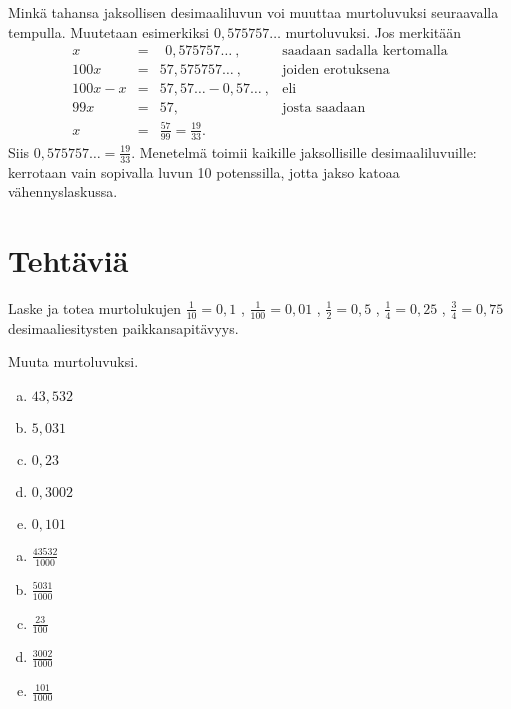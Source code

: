 Minkä tahansa jaksollisen desimaaliluvun voi muuttaa murtoluvuksi seuraavalla tempulla.
Muutetaan esimerkiksi $0,575757\ldots$ murtoluvuksi. Jos merkitään
\[
\begin{array}{rcll}
x &=& \ \, 0,575757 \ldots\ , &\textrm{saadaan sadalla kertomalla} \\
100x &=& 57,575757 \ldots \ , &\textrm{joiden erotuksena} \\
100x - x &=& 57,57 \ldots - 0,57 \ldots \ , & \textrm{eli} \\
99x &=& 57, & \textrm{josta saadaan} \\
x &=& \frac{57}{99} = \frac{19}{33}.
\end{array}
\]
Siis $0,575757\ldots = \frac{19}{33}$. Menetelmä toimii kaikille jaksollisille
desimaaliluvuille: kerrotaan vain sopivalla luvun 10 potenssilla, jotta jakso
katoaa vähennyslaskussa.


\section*{Tehtäviä}

\begin{tehtava}
Laske ja totea murtolukujen 
 $ \frac{1}{10} = 0,1$ , 
$ \frac{1}{100} = 0,01$ , 
 $ \frac{1}{2} = 0,5$ , 
$ \frac{1}{4} = 0,25$ , 
$ \frac{3}{4} = 0,75$
desimaaliesitysten paikkansapitävyys.
\end{tehtava}

\begin{tehtava}
Muuta murtoluvuksi.
	\begin{enumerate}[a)]
		\item $43{,}532$
		\item $5{,}031$
		\item $0{,}23$
		\item $0{,}3002$
		\item $0{,}101$
	\end{enumerate}
\begin{vastaus}
	\begin{enumerate}[a)]
		\item $ \frac{43532}{1000}$
		\item $ \frac{5031}{1000}$
		\item $ \frac{23}{100}$
		\item $ \frac{3002}{1000}$
		\item $ \frac{101}{1000}$
	\end{enumerate}
\end{vastaus}
\end{tehtava}

